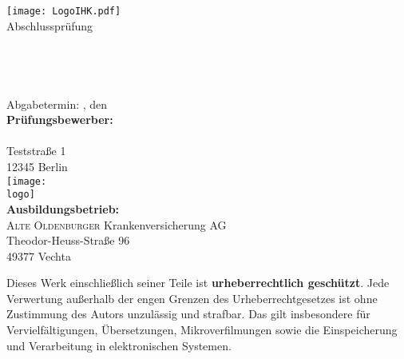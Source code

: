 \begin{titlepage}

\begin{center}
\texttt{[image: LogoIHK.pdf]}\\[1ex]
\Large{Abschlussprüfung \pruefungstermin}\\[3ex]

\Large{\ausbildungsberuf}\\
\LARGE{\betreff}\\[4ex]

\huge{\textbf{\titel}}\\[1.5ex]
\Large{\textbf{\untertitel}}\\[4ex]

\normalsize
Abgabetermin: \ort, den \abgabetermin\\[3em]
\textbf{Prüfungsbewerber:}\\
\autor\\
Teststraße 1\\
12345 Berlin\\[5ex]

\texttt{[image: \\logo]}\\[2ex]
\textbf{Ausbildungsbetrieb:}\\
\textsc{Alte Oldenburger} Krankenversicherung AG\\
Theodor-Heuss-Straße 96\\
49377 Vechta\\[5em]
\end{center}

\small
\noindent
Dieses Werk einschließlich seiner Teile ist \textbf{urheberrechtlich geschützt}.
Jede Verwertung außerhalb der engen Grenzen des Urheberrechtgesetzes ist ohne
Zustimmung des Autors unzulässig und strafbar. Das gilt insbesondere für
Vervielfältigungen, Übersetzungen, Mikroverfilmungen sowie die Einspeicherung
und Verarbeitung in elektronischen Systemen.

\end{titlepage}